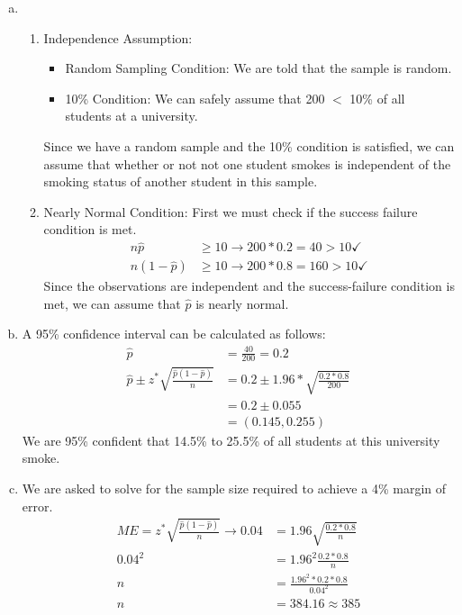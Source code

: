 {
\begin{enumerate}[(a)]
\item
\begin{enumerate}[1.]
\item Independence Assumption: 
\begin{itemize}
\item Random Sampling Condition: We are told that the sample is random.
\item 10\% Condition: We can safely assume that 200 $<$ 10\% of all students at a university.
\end{itemize}
Since we have a random sample and the 10\% condition is satisfied, we can assume that whether or not not one student smokes is independent of the smoking status of another student in this sample.
\item Nearly Normal Condition: First we must check if the success failure condition is met.
\begin{align*}
n\hat{p} &\ge 10 \rightarrow 200 * 0.2 = 40 > 10 \checkmark \\
n(1 - \hat{p}) &\ge 10 \rightarrow 200 * 0.8 = 160 > 10 \checkmark
\end{align*}
Since the observations are independent and the success-failure condition is met, we can assume that $\hat{p}$ is nearly normal.
\end{enumerate}

\item A 95\% confidence interval can be calculated as follows:
\begin{align*}
\hat{p} &= \frac{40}{200} = 0.2 \\
\hat{p} \pm z^* \sqrt{\frac{\hat{p} (1 - \hat{p})}{n}} &= 0.2 \pm 1.96 * \sqrt{\frac{0.2*0.8}{200}} \\
&= 0.2 \pm 0.055 \\
&= (0.145 , 0.255)
\end{align*}
We are 95\% confident that 14.5\% to 25.5\% of all students at this university smoke.

\item We are asked to solve for the sample size required to achieve a 4\% margin of error. 
\begin{align*}
ME = z^* \sqrt{ \frac{\hat{p} (1-\hat{p})} {n} } \rightarrow 0.04 &= 1.96 \sqrt{ \frac{0.2 * 0.8} {n} } \\
0.04^2 &= 1.96^2  \frac{0.2 * 0.8}{n} \\
n &= \frac{1.96 ^2 * 0.2 * 0.8}{0.04^2} \\
n &= 384.16 \approx 385
\end{align*}


\end{enumerate}}
